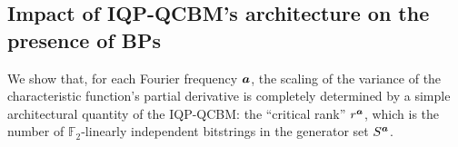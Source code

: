 \documentclass{article}
\theoremstyle{plain}
\theoremstyle{definition}
\theoremstyle{remark}
\begin{document}
\subsection{Impact of IQP-QCBM's architecture on the presence of BPs} \label{subsec:uniform}
We show that, for each Fourier frequency ${\bm{a}}$, the scaling of the variance of the characteristic function's partial derivative is completely determined by a simple architectural quantity of the IQP-QCBM: the ``critical rank'' $r^{\bm{a}}$, which is the number of $\mathbb{F}_2$-linearly independent bitstrings in the generator set $S^{\bm{a}}$.
\end{document}
